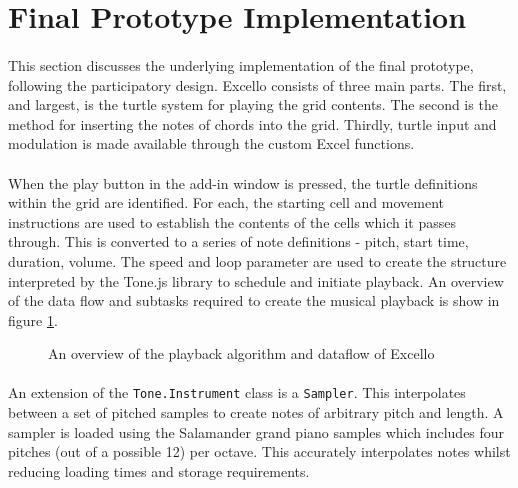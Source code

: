 \section{Final Prototype Implementation}

\paragraph{} This section discusses the underlying implementation of the final prototype, following the participatory design. Excello consists of three main parts. The first, and largest, is the turtle system for playing the grid contents. The second is the method for inserting the notes of chords into the grid. Thirdly, turtle input and modulation is made available through the custom Excel functions.

\paragraph{} When the play button in the add-in window is pressed, the turtle definitions within the grid are identified. For each, the starting cell and movement instructions are used to establish the contents of the cells which it passes through. This is converted to a series of note definitions - pitch, start time, duration, volume. The speed and loop parameter are used to create the structure interpreted by the Tone.js library to schedule and initiate playback. An overview of the data flow and subtasks required to create the musical playback is show in figure \ref{fig:overview}.

\begin{figure}[tbh]
\begin{center}

\end{center}
\caption{An overview of the playback algorithm and dataflow of Excello}
\label{fig:overview}
\end{figure}

\paragraph{} An extension of the \texttt{Tone.Instrument} class is a \texttt{Sampler}. This interpolates between a set of pitched samples to create notes of arbitrary pitch and length. A sampler is loaded using the Salamander grand piano samples which includes four pitches (out of a possible 12) per octave. This accurately interpolates notes whilst reducing loading times and storage requirements.

